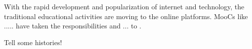 With the rapid development and popularization of internet and technology, the traditional educational activities are moving to the online platforms. MooCs like ..... have taken the responsibilities and ... to .

Tell some histories!
